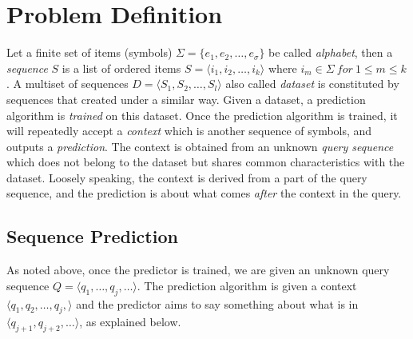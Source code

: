 \section{Problem Definition}
Let a finite set of items (symbols) \(\Sigma = \{e_1, e_2,\ldots,e_\sigma\}\) be called \emph{alphabet}, then a \emph{sequence} \(S\) is a list of ordered items \(S=\langle i_1,i_2,\ldots,i_k\rangle\) where \(i_m \in \Sigma\ for\ 1\leq m \leq k\). A multiset of sequences \(D = \langle S_1, S_2,\ldots,S_l\rangle\) also called \emph{dataset} is constituted by sequences that created under a similar way. Given a dataset, a prediction algorithm is \emph{trained} on this dataset.  Once the prediction algorithm is trained, it will repeatedly accept a \emph{context} which is another sequence of symbols, and outputs a \emph{prediction}. The context is obtained from an unknown \emph{query sequence} which does not belong to the dataset but shares common characteristics with the dataset.  Loosely speaking, the context is derived from a part of the query sequence, and the prediction is about what comes \emph{after} the context in the query.



\subsection{Sequence Prediction}
As noted above, once the predictor is trained, we are given an unknown query sequence \(Q = \langle q_1, \ldots, q_j, \ldots \rangle\).  The prediction algorithm is given a context \(\langle q_1, q_2,\ldots, q_j,\rangle\) and the predictor aims to say something about what is in \(\langle q_{j+1},q_{j+2},\ldots\rangle\), as explained below.%
